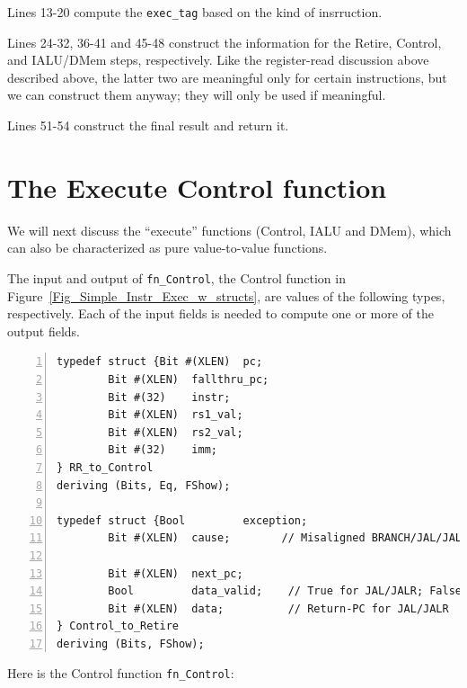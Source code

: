 Lines 13-20 compute the \verb|exec_tag| based on the kind of
insrruction.

Lines 24-32, 36-41 and 45-48 construct the information for the Retire,
Control, and IALU/DMem steps, respectively.  Like the register-read
discussion above described above, the latter two are meaningful only
for certain instructions, but we can construct them anyway; they will
only be used if meaningful.

Lines 51-54 construct the final result and return it.


\section{The Execute Control function}

\label{Sec_Control_function}


We will next discuss the ``execute'' functions (Control, IALU and
DMem), which can also be characterized as pure value-to-value
functions.

The input and output of \verb|fn_Control|, the Control function in
Figure~\ref{Fig_Simple_Instr_Exec_w_structs}, are values of the
following types, respectively.  Each of the input fields is needed to
compute one or more of the output fields.

{\small
\begin{Verbatim}[frame=single, numbers=left]
typedef struct {Bit #(XLEN)  pc;
		Bit #(XLEN)  fallthru_pc;
		Bit #(32)    instr;
		Bit #(XLEN)  rs1_val;
		Bit #(XLEN)  rs2_val;
		Bit #(32)    imm;
} RR_to_Control
deriving (Bits, Eq, FShow);

typedef struct {Bool         exception;
		Bit #(XLEN)  cause;        // Misaligned BRANCH/JAL/JALR target

		Bit #(XLEN)  next_pc;
		Bool         data_valid;    // True for JAL/JALR; False for BRANCH
		Bit #(XLEN)  data;          // Return-PC for JAL/JALR
} Control_to_Retire
deriving (Bits, FShow);
\end{Verbatim}
}

Here is the Control function \verb|fn_Control|:

